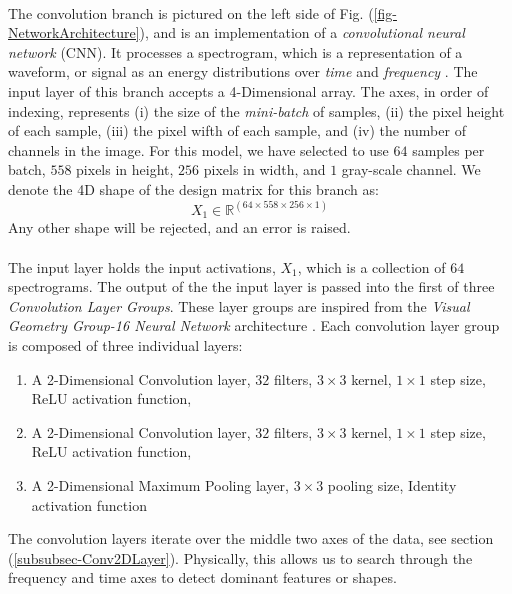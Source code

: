 \documentclass[12pt,letterpaper]{article}
\begin{document}
\paragraph*{}The convolution branch is pictured on the left side of Fig. (\ref{fig-NetworkArchitecture}), and is an implementation of a \textit{convolutional neural network} (CNN). It processes a spectrogram, which is a representation of a waveform, or signal as an energy distributions over \textit{time} and \textit{frequency} \cite{White,Olson,Khan}. The input layer of this branch accepts a 4-Dimensional array. The axes, in order of indexing, represents (i) the size of the \textit{mini-batch} of samples, (ii) the pixel height of each sample, (iii) the pixel wifth of each sample, and (iv) the number of channels in the image. For this model, we have selected to use $64$ samples per batch, $558$ pixels in height, $256$ pixels in width, and $1$ gray-scale channel. We denote the 4D shape of the design matrix for this branch as:
\begin{equation}
\label{eqn-shapeX1}
X_1 \in \mathbb{R}^{(64 \times 558 \times 256 \times 1)}
\end{equation}
Any other shape will be rejected, and an error is raised.

\paragraph*{}The input layer holds the input activations, $X_1$, which is a collection of $64$ spectrograms. The output of the the input layer is passed into the first of three \textit{Convolution Layer Groups}. These layer groups are inspired from the \textit{Visual Geometry Group-16 Neural Network} architecture \cite{Goodfellow,Loy}. Each convolution layer group is composed of three individual layers: 
\begin{enumerate}
\item A 2-Dimensional Convolution layer, $32$ filters, $3 \times 3$ kernel, $1 \times 1$ step size, ReLU activation function,
\item A 2-Dimensional Convolution layer, $32$ filters, $3 \times 3$ kernel, $1 \times 1$ step size, ReLU activation function,
\item A 2-Dimensional Maximum Pooling layer, $3 \times 3$ pooling size, Identity activation function
\end{enumerate}  
The convolution layers iterate over the middle two axes of the data, see section (\ref{subsubsec-Conv2DLayer}). Physically, this allows us to search through the frequency and time axes to detect dominant features or shapes.
\end{document}
